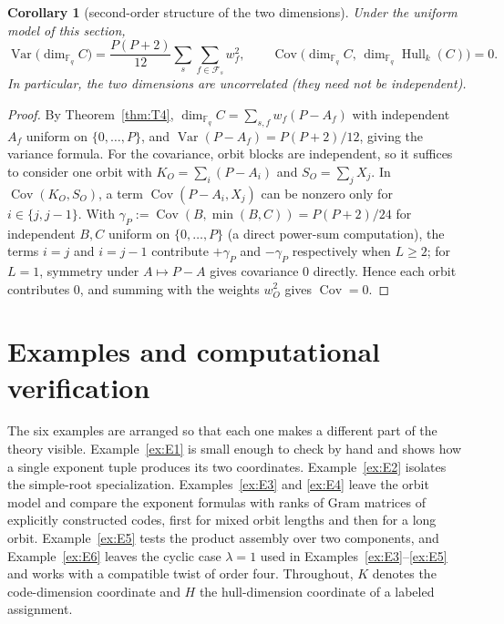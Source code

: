 \documentclass[11pt]{article}
\newtheorem{corollary}[theorem]{Corollary}
\theoremstyle{definition}
\theoremstyle{remark}
\newcommand{\Fq}{\mathbb{F}_q}
\newcommand{\Hull}{\operatorname{Hull}}
\begin{document}
\begin{corollary}[second-order structure of the two dimensions]\label{cor:secondorder}
Under the uniform model of this section,
\[
\operatorname{Var}\big(\dim_{\Fq} C\big)
= \frac{P(P+2)}{12}\sum_s\sum_{f\in\mathcal{F}_s} w_f^2,
\qquad
\operatorname{Cov}\big(\dim_{\Fq} C,\,\dim_{\Fq}\Hull_k(C)\big)=0.
\]
In particular, the two dimensions are uncorrelated (they need not be
independent).
\end{corollary}

\begin{proof}
By Theorem~\ref{thm:T4},
\(\dim_{\Fq} C=\sum_{s,f} w_f(P-A_f)\) with independent \(A_f\) uniform
on \(\{0,\dots,P\}\), and
\(\operatorname{Var}(P-A_f)=P(P+2)/12\), giving the variance formula.
For the covariance, orbit blocks are independent, so it suffices to
consider one orbit with \(K_O=\sum_i(P-A_i)\) and \(S_O=\sum_j X_j\).
In \(\operatorname{Cov}(K_O,S_O)\), a term
\(\operatorname{Cov}(P-A_i,X_j)\) can be nonzero only for
\(i\in\{j,j-1\}\). With
\(\gamma_P:=\operatorname{Cov}(B,\min(B,C))=P(P+2)/24\) for independent
\(B,C\) uniform on \(\{0,\dots,P\}\) (a direct power-sum computation),
the terms \(i=j\) and \(i=j-1\) contribute \(+\gamma_P\) and
\(-\gamma_P\) respectively when \(L\ge2\); for \(L=1\), symmetry under
\(A\mapsto P-A\) gives covariance \(0\) directly. Hence each orbit
contributes \(0\), and summing with the weights \(w_O^2\) gives
\(\operatorname{Cov}=0\).
\end{proof}

\section{Examples and computational verification}\label{sec:examples}

The six examples are arranged so that each one makes a different part
of the theory visible. Example~\ref{ex:E1} is small enough to check by
hand and shows how a single exponent tuple produces its two coordinates.
Example~\ref{ex:E2} isolates the simple-root specialization.
Examples~\ref{ex:E3} and \ref{ex:E4} leave the orbit model and compare
the exponent formulas with ranks of Gram matrices of explicitly
constructed codes, first for mixed orbit lengths and then for a long
orbit. Example~\ref{ex:E5} tests the product assembly over two
components, and Example~\ref{ex:E6} leaves the cyclic case \(\lambda = 1\)
used in Examples~\ref{ex:E3}--\ref{ex:E5} and works with a compatible
twist of order four. Throughout, \(K\) denotes the code-dimension coordinate and
\(H\) the hull-dimension coordinate of a labeled assignment.
\end{document}
